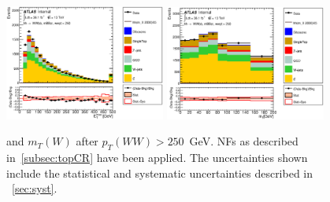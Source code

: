 \begin{figure}[!h]
\begin{center}
\includegraphics*[width=0.47\textwidth] {figures/ControlPlots/reOpt2000/C_mBBcr_reOpt2000_bbpt350_wwpt250_MET_regionA_met25d020}
\includegraphics*[width=0.47\textwidth] {figures/ControlPlots/reOpt2000/C_mBBcr_reOpt2000_bbpt350_wwpt250_wlepmtben_regionA_met25d020.eps}
\caption[\met and  $m_{T}(W)$ after $p_{T}(WW) > 250$~GeV.]{\met and  $m_{T}(W)$ after $p_{T}(WW) > 250$~GeV.  \ttbar NFs as described in~\ref{subsec:topCR} have been applied. The uncertainties shown include the statistical and systematic uncertainties described in ~\ref{sec:syst}.}
\end{center}
\end{figure}


